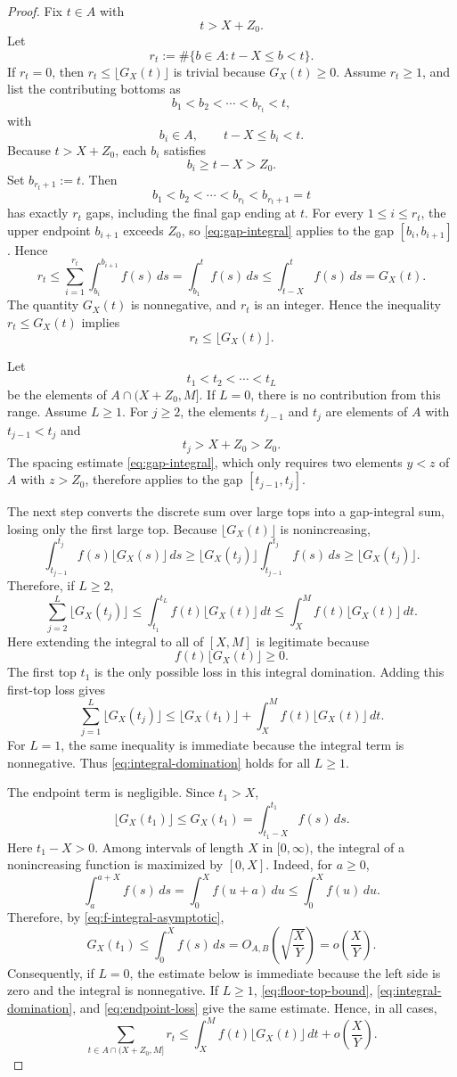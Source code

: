 \documentclass[11pt]{article}
\begin{document}
\begin{proof}
Fix $t\in A$ with
\[
t>X+Z_0.
\]
Let
\[
r_t:=\#\{b\in A:t-X\le b<t\}.
\]
If $r_t=0$, then $r_t\le\lfloor G_X(t)\rfloor$ is trivial because $G_X(t)\ge0$. Assume
$r_t\ge1$, and list the contributing bottoms as
\[
b_1<b_2<\cdots<b_{r_t}<t,
\]
with
\[
b_i\in A,
\qquad
 t-X\le b_i<t.
\]
Because $t>X+Z_0$, each $b_i$ satisfies
\[
b_i\ge t-X>Z_0.
\]
Set $b_{r_t+1}:=t$. Then
\[
b_1<b_2<\cdots<b_{r_t}<b_{r_t+1}=t
\]
has exactly $r_t$ gaps, including the final gap ending at $t$. For every $1\le i\le r_t$, the
upper endpoint $b_{i+1}$ exceeds $Z_0$, so
\eqref{eq:gap-integral} applies to the gap $[b_i,b_{i+1}]$. Hence
\[
r_t
\le
\sum_{i=1}^{r_t}\int_{b_i}^{b_{i+1}} f(s)\,ds
=
\int_{b_1}^t f(s)\,ds
\le
\int_{t-X}^t f(s)\,ds
=
G_X(t).
\]
The quantity $G_X(t)$ is nonnegative, and $r_t$ is an integer. Hence the inequality $r_t\le
G_X(t)$ implies
\[
r_t\le \lfloor G_X(t)\rfloor.
\tag{16}\label{eq:floor-top-bound}
\]

Let
\[
t_1<t_2<\cdots<t_L
\]
be the elements of $A\cap(X+Z_0,M]$. If $L=0$, there is no contribution from this range. Assume
$L\ge1$. For $j\ge2$, the elements $t_{j-1}$ and $t_j$ are elements of $A$ with $t_{j-1}<t_j$
and
\[
t_j>X+Z_0>Z_0.
\]
The spacing estimate \eqref{eq:gap-integral}, which only requires two elements $y<z$ of $A$
with $z>Z_0$, therefore applies to the gap $[t_{j-1},t_j]$.

The next step converts the discrete sum over large tops into a gap-integral sum, losing only
the first large top. Because $\lfloor G_X(t)\rfloor$ is nonincreasing,
\[
\int_{t_{j-1}}^{t_j}
 f(s)\lfloor G_X(s)\rfloor\,ds
\ge
\lfloor G_X(t_j)\rfloor
\int_{t_{j-1}}^{t_j}f(s)\,ds
\ge
\lfloor G_X(t_j)\rfloor.
\]
Therefore, if $L\ge2$,
\[
\sum_{j=2}^L\lfloor G_X(t_j)\rfloor
\le
\int_{t_1}^{t_L} f(t)\lfloor G_X(t)\rfloor\,dt
\le
\int_X^M f(t)\lfloor G_X(t)\rfloor\,dt.
\]
Here extending the integral to all of $[X,M]$ is legitimate because
\[
f(t)\lfloor G_X(t)\rfloor\ge0.
\]
The first top $t_1$ is the only possible loss in this integral domination. Adding this
first-top loss gives
\[
\sum_{j=1}^L\lfloor G_X(t_j)\rfloor
\le
\lfloor G_X(t_1)\rfloor
+
\int_X^M f(t)\lfloor G_X(t)\rfloor\,dt.
\tag{17}\label{eq:integral-domination}
\]
For $L=1$, the same inequality is immediate because the integral term is nonnegative. Thus
\eqref{eq:integral-domination} holds for all $L\ge1$.

The endpoint term is negligible. Since $t_1>X$,
\[
\lfloor G_X(t_1)\rfloor
\le
G_X(t_1)
=
\int_{t_1-X}^{t_1}f(s)\,ds.
\]
Here $t_1-X>0$. Among intervals of length $X$ in $[0,\infty)$, the integral of a nonincreasing
function is maximized by $[0,X]$. Indeed, for $a\ge0$,
\[
\int_a^{a+X}f(s)\,ds
=
\int_0^X f(u+a)\,du
\le
\int_0^X f(u)\,du.
\]
Therefore, by \eqref{eq:f-integral-asymptotic},
\[
G_X(t_1)
\le
\int_0^X f(s)\,ds
=
O_{A,B}\left(\sqrt{\frac X Y}\right)
=
o\left(\frac X Y\right).
\tag{18}\label{eq:endpoint-loss}
\]
Consequently, if $L=0$, the estimate below is immediate because the left side is zero and the
integral is nonnegative. If $L\ge1$, \eqref{eq:floor-top-bound},
\eqref{eq:integral-domination}, and \eqref{eq:endpoint-loss} give the same estimate. Hence, in all
cases,
\[
\sum_{t\in A\cap(X+Z_0,M]} r_t
\le
\int_X^M f(t)\lfloor G_X(t)\rfloor\,dt
+
o\left(\frac X Y\right).
\]


\end{proof}
\end{document}

